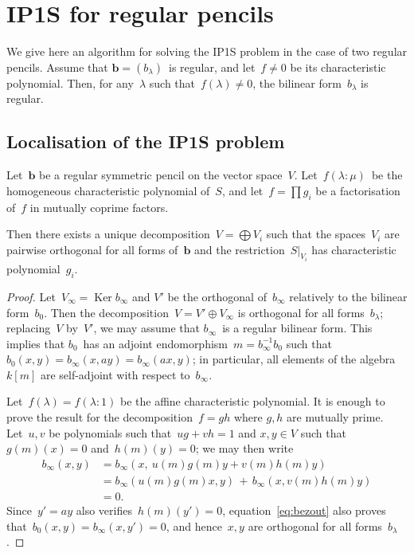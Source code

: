 \documentclass{lms}%
\DeclareMathOperator\Ker{Ker}
\begin{document}
\section{IP1S for regular pencils}%
\label{S:IP1S-regular}

We give here an algorithm for solving the IP1S problem in the case of two
regular pencils. Assume that $\bm{b} = (b_{λ})$~is regular, and let~$f ≠ 0$
be its characteristic polynomial. Then, for any~$λ$ such that~$f(λ) ≠ 0$,
the bilinear form~$b_{λ}$ is regular.

\subsection{Localisation of the IP1S problem}%

\begin{lem}\label{lem:decomp-bezout}%
Let~$\bm{b}$ be a regular symmetric pencil on the vector space~$V$. Let~$f(λ:
μ)$~be the homogeneous characteristic polynomial of~$S$, and let~$f = ∏
g_i$ be a factorisation of~$f$ in mutually coprime factors.

Then there exists a unique decomposition~$V = ⨁ V_i$ such that the
spaces~$V_i$ are pairwise orthogonal for all forms of~$\bm{b}$ and the
restriction~$S|_{V_i}$ has characteristic polynomial~$g_i$.
\end{lem}

\begin{proof}
Let~$V_{∞} = \Ker b_{∞}$ and $V'$ be the orthogonal of~$b_{∞}$ relatively
to the bilinear form~$b_{0}$. Then the decomposition~$V = V' ⊕ V_{∞}$ is
orthogonal for all forms~$b_{λ}$; replacing~$V$ by~$V'$, we may assume
that $b_{∞}$~is a regular bilinear form. This implies that $b_0$~has an
adjoint endomorphism~$m = b_{∞}^{-1} b_0$ such that~$b_0(x,y) = b_{∞}(x,
ay) = b_{∞}(ax, y)$; in particular, all elements of the algebra~$k[m]$
are self-adjoint with respect to~$b_{∞}$.

Let~$f(λ) = f(λ: 1)$ be the affine characteristic polynomial. It is
enough to prove the result for the decomposition~$f = gh$ where $g, h$
are mutually prime. Let~$u, v$ be polynomials such that~$ug + vh = 1$ and
$x, y ∈ V$ such that~$g(m)(x) = 0$ and~$h(m)(y) = 0$; we may then write
\begin{equation}\label{eq:bezout}
\begin{split}
b_{∞} (x, y) & = b_{∞} (x,\: u(m) g(m) y + v(m) h(m) y ) \\
&= b_{∞} (u(m) g(m) x, y) \,+\, b_{∞} (x, v(m) h(m) y) \\
&= 0.
\end{split}
\end{equation}
Since~$y' = ay$ also verifies~$h(m)(y') = 0$, equation~\eqref{eq:bezout}
also proves that~$b_{0}(x,y) = b_{∞}(x,y') = 0$, and hence~$x, y$ are
orthogonal for all forms~$b_{λ}$.
\end{proof}%
\end{document}
